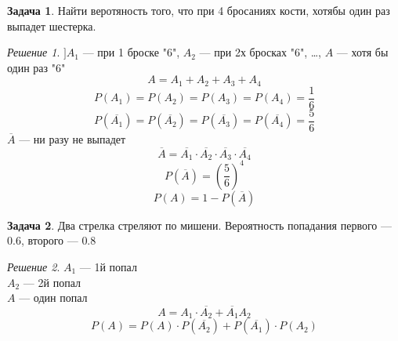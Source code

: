 \documentclass[oneside]{book}
\theoremstyle{plain}
\theoremstyle{remark}
\newtheorem*{solution}{Решение}
\theoremstyle{definition}
\newtheorem{task}{Задача}
\begin{document}
\begin{task}
Найти веротяность того, что при 4 бросаниях кости, хотябы один раз выпадет шестерка.
\end{task}
\begin{solution}
\(] A_1\) --- при 1 броске "6", \(A_2\) --- при 2х бросках "6", \dots{}, \(A\) --- хотя бы один раз "6"
\[ A = A_1 + A_2 + A_3 + A_4 \]
\[ P(A_1) = P(A_2) = P(A_3) = P(A_4) = \frac{1}{6} \]
\[ P(\overline{A_1}) = P(\overline{A_2}) = P(\overline{A_3}) = P(\overline{A_4}) = \frac{5}{6} \]
\(\overline{A}\) --- ни разу не выпадет
\[ \overline{A} = \overline{A_1}\cdot\overline{A_2}\cdot\overline{A_3}\cdot\overline{A_4} \]
\[ P(\overline{A}) = \left(\frac{5}{6}\right)^4  \]
\[ P(A) = 1 - P(\overline{A}) \]
\end{solution}
\begin{task}
Два стрелка стреляют по мишени. Вероятность попадания первого --- \(0.6\), второго --- \(0.8\)
\end{task}
\begin{solution}
\(A_1\) --- 1й попал \\
\(A_2\) --- 2й попал \\
\(A\) --- один попал
\[ A = A_1\cdot\overline{A_2} + \overline{A_1}A_2 \]
\[ P(A)  = P(A)\cdot P(\overline{A_2}) + P(\overline{A_1})\cdot P(A_2) \]
\end{solution}
\end{document}

